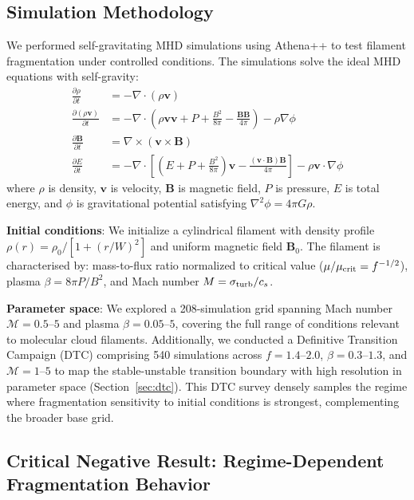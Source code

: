 \documentclass[twoside,twocolumn]{mnras}
\begin{document}
\subsection{Simulation Methodology}

We performed self-gravitating MHD simulations using Athena++ \citep{Stone2020} to test filament fragmentation under controlled conditions. The simulations solve the ideal MHD equations with self-gravity:
\begin{align}
\frac{\partial \rho}{\partial t} &= -\nabla \cdot (\rho \mathbf{v}) \\
\frac{\partial (\rho \mathbf{v})}{\partial t} &= -\nabla \cdot \left(\rho \mathbf{v} \mathbf{v} + P + \frac{B^2}{8\pi} - \frac{\mathbf{B}\mathbf{B}}{4\pi}\right) - \rho \nabla \phi \\
\frac{\partial \mathbf{B}}{\partial t} &= \nabla \times (\mathbf{v} \times \mathbf{B}) \\
\frac{\partial E}{\partial t} &= -\nabla \cdot \left[(E + P + \frac{B^2}{8\pi})\mathbf{v} - \frac{(\mathbf{v} \cdot \mathbf{B})\mathbf{B}}{4\pi}\right] - \rho \mathbf{v} \cdot \nabla \phi
\end{align}
where $\rho$ is density, $\mathbf{v}$ is velocity, $\mathbf{B}$ is magnetic field, $P$ is pressure, $E$ is total energy, and $\phi$ is gravitational potential satisfying $\nabla^2 \phi = 4\pi G\rho$.

\textbf{Initial conditions}: We initialize a cylindrical filament with density profile $\rho(r) = \rho_0 / [1 + (r/W)^2]$ and uniform magnetic field $\mathbf{B}_0$. The filament is characterised by: mass-to-flux ratio normalized to critical value ($\mu/\mu_{\rm crit} = f^{-1/2}$), plasma $\beta = 8\pi P/B^2$, and Mach number $M = \sigma_{\rm turb}/c_s$.

\textbf{Parameter space}: We explored a 208-simulation grid spanning Mach number $\mathcal{M} = 0.5$--$5$ and plasma $\beta = 0.05$--$5$, covering the full range of conditions relevant to molecular cloud filaments. Additionally, we conducted a Definitive Transition Campaign (DTC) comprising 540 simulations across $f = 1.4$--$2.0$, $\beta = 0.3$--$1.3$, and $\mathcal{M} = 1$--$5$ to map the stable-unstable transition boundary with high resolution in parameter space (Section~\ref{sec:dtc}). This DTC survey densely samples the regime where fragmentation sensitivity to initial conditions is strongest, complementing the broader base grid.

\subsection{Critical Negative Result: Regime-Dependent Fragmentation Behavior}
\end{document}
